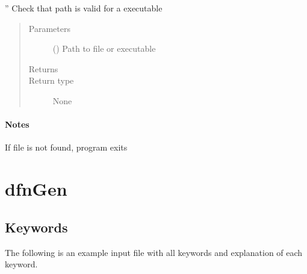 \documentclass[letterpaper,10pt,english]{sphinxmanual}
\begin{document}

\begin{fulllineitems}
\label{\detokenize{pydfnworks:pydfnworks.general.paths.valid}}
” Check that path is valid for a executable
\begin{quote}\begin{description}
\item[{Parameters}] \leavevmode
{} () \textendash{} Path to file or executable

\item[{Returns}] \leavevmode


\item[{Return type}] \leavevmode
None

\end{description}\end{quote}
\subsubsection*{Notes}

If file is not found, program exits

\end{fulllineitems}



\chapter{dfnGen}
\label{\detokenize{dfngen:dfngen}}\label{\detokenize{dfngen:dfngen-chapter}}\label{\detokenize{dfngen::doc}}

\section{Keywords}
\label{\detokenize{dfngen:keywords}}
The following is an example input file with all keywords and explanation of each keyword.
\end{document}
